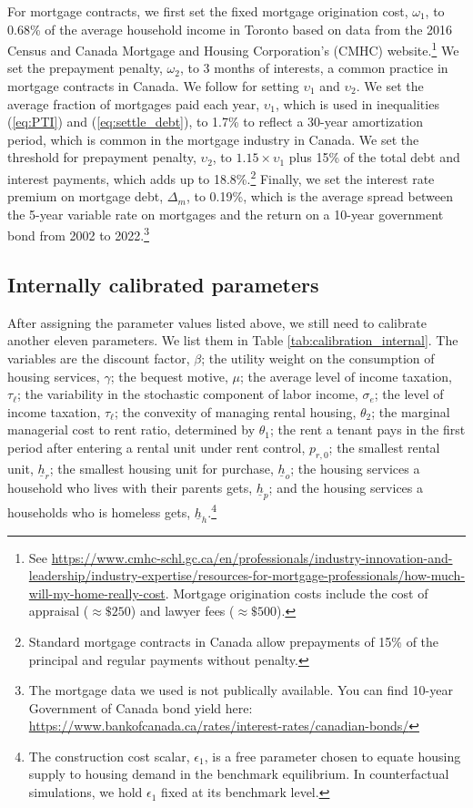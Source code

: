 \documentclass[parskip=full]{article}
\begin{document}
For mortgage contracts, we first set the fixed mortgage origination cost, $\omega_{1}$, to 0.68\% of the average household income in Toronto based on data from the 2016 Census and Canada Mortgage and Housing Corporation's (CMHC) website.\footnote{See \url{https://www.cmhc-schl.gc.ca/en/professionals/industry-innovation-and-leadership/industry-expertise/resources-for-mortgage-professionals/how-much-will-my-home-really-cost}. Mortgage origination costs include the cost of appraisal ($\approx\$250$) and lawyer fees ($\approx\$500$).} We set the prepayment penalty, $\omega_{2}$, to 3 months of interests, a common practice in mortgage contracts in Canada. We follow \citet{rs-2023} for setting $\upsilon_{1}$ and $\upsilon_{2}$. We set the average fraction of mortgages paid each year, $\upsilon_{1}$, which is used in inequalities (\ref{eq:PTI}) and (\ref{eq:settle_debt}), to 1.7\% to reflect a 30-year amortization period, which is common in the mortgage industry in Canada. We set the threshold for prepayment penalty, $\upsilon_{2}$, to $1.15 \times \upsilon_{1}$ plus 15\% of the total debt and interest payments, which adds up to 18.8\%.\footnote{Standard mortgage contracts in Canada allow prepayments of 15\% of the principal and regular payments without penalty.} Finally, we set the interest rate premium on mortgage debt, $\Delta_{m}$, to 0.19\%, which is the average spread between the 5-year variable rate on mortgages and the return on a 10-year government bond from 2002 to 2022.\footnote{The mortgage data we used is not publically available. You can find 10-year Government of Canada bond yield here: \url{https://www.bankofcanada.ca/rates/interest-rates/canadian-bonds/}}

\subsection{Internally calibrated parameters}

After assigning the parameter values listed above, we still need to calibrate another eleven parameters. We list them in Table \ref{tab:calibration_internal}. The variables are the discount factor, $\beta$; the utility weight on the consumption of housing services, $\gamma$; the bequest motive, $\mu$; the average level of income taxation, $\tau_{\ell}$; the variability in the stochastic component of labor income, $\sigma_{e}$; the level of income taxation, $\tau_{\ell}$; the convexity of managing rental housing, $\theta_{2}$; the marginal managerial cost to rent ratio, determined by $\theta_{1}$; the rent a tenant pays in the first period after entering a rental unit under rent control, $p_{r,0}$; the smallest rental unit, $\underline{h}_{r}$; the smallest housing unit for purchase, $\underline{h}_{o}$; the housing services a household who lives with their parents gets, $\underline{h}_{p}$; and the housing services a households who is homeless gets, $\underline{h}_{h}$.\footnote{The construction cost scalar, $\epsilon_{1}$, is a free parameter chosen to equate housing supply to housing demand in the benchmark equilibrium. In counterfactual simulations, we hold $\epsilon_{1}$ fixed at its benchmark level.}
\end{document}
